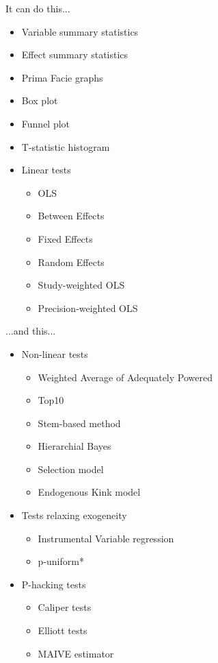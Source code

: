 \documentclass{beamer} %
\begin{document}
\begin{frame}{It can do this...}
    \begin{itemize}
        \item Variable summary statistics
        \item Effect summary statistics
        \item Prima Facie graphs
        \item Box plot
        \item Funnel plot
        \item T-statistic histogram
        \item Linear tests
              \begin{itemize}
                  \item OLS
                  \item Between Effects
                  \item Fixed Effects
                  \item Random Effects
                  \item Study-weighted OLS
                  \item Precision-weighted OLS
              \end{itemize}
    \end{itemize}
\end{frame}



\begin{frame}{...and this...}
    \begin{itemize}

        \item Non-linear tests
              \begin{itemize}
                  \item Weighted Average of Adequately Powered
                  \item Top10
                  \item Stem-based method
                  \item Hierarchial Bayes
                  \item Selection model
                  \item Endogenous Kink model
              \end{itemize}
        \item Tests relaxing exogeneity
              \begin{itemize}
                  \item Instrumental Variable regression
                  \item p-uniform*
              \end{itemize}
        \item P-hacking tests
              \begin{itemize}
                  \item Caliper tests
                  \item Elliott tests
                  \item MAIVE estimator
              \end{itemize}

    \end{itemize}
\end{frame}
\end{document}
